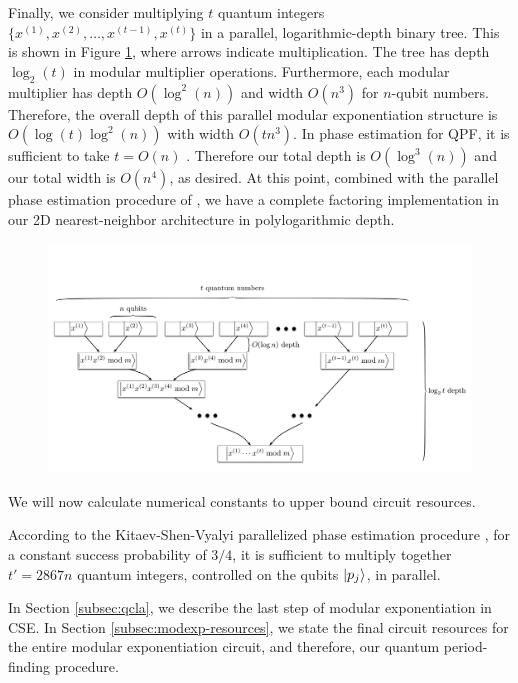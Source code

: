 \documentclass[twoside]{article}
\begin{document}
Finally, we consider multiplying $t$ quantum integers
$\{x^{(1)}, x^{(2)}, \ldots, x^{(t-1)}, x^{(t)}\}$ in a parallel,
logarithmic-depth binary tree.
This is shown in Figure \ref{fig:modexp-qq-parallel}, where arrows indicate multiplication.
The tree has depth $\log_2(t)$ in modular multiplier operations. Furthermore,
each
modular multiplier has depth $O(\log^2(n))$ and width $O(n^3)$ for $n$-qubit
numbers. Therefore, the overall depth of this parallel modular exponentiation
structure is $O(\log(t)\log^2(n))$ with width $O(tn^3)$.
In phase estimation for QPF, it is
sufficient to take $t = O(n)$ \cite{Nielsen2000,Kitaev2002}. Therefore our total depth is
$O(\log^3(n))$ and our total width is $O(n^4)$, as desired. At this point, combined with the parallel phase
estimation procedure of \cite{Kitaev2002}, we have a complete factoring
implementation in our 2D nearest-neighbor architecture in polylogarithmic
depth.
%
\begin{figure}[tb!]
\centerline{
\includegraphics[width=5.5in]{./mod-exp-par.pdf}
}
\vspace{5pt}
\label{fig:modexp-qq-parallel}
\end{figure}

We will now calculate numerical
constants to upper bound circuit resources.

According to the Kitaev-Shen-Vyalyi parallelized phase estimation procedure
\cite{Kitaev2002},
for a constant success probability of $3/4$,
it is sufficient to multiply together $t' = 2867n$ quantum integers,
controlled on the qubits $\left\vert{p_j}\right\rangle$, in parallel.

In Section \ref{subsec:qcla}, we describe the last step of modular
exponentiation in CSE. In Section \ref{subsec:modexp-resources}, we
state the final circuit resources for the entire modular exponentiation
circuit,
and therefore, our quantum period-finding procedure.
\end{document}
